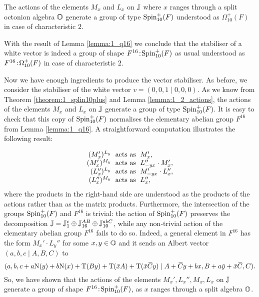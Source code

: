 \begin{theorem}
	\label{theorem:1_splin10plus}
	The actions of the elements $M_x$ and $L_x$ on $\mathbb{J}$ where $x$ ranges through a 
	split octonion algebra $\mathbb{O}$
	generate a group of type $\mathrm{Spin}_{10}^+(F)$ understood as $\Omega_{10}^+(F)$
	in case of characteristic $2$. 
\end{theorem}

With the result of Lemma \ref{lemma:1_q16} we conclude that the stabiliser of a white
vector is indeed a group of shape
$F^{16}\mathord{{\;\!{:}\;\!}}\mathrm{Spin}_{10}^+(F)$ as usual understood as $F^{16}\mathord{{\;\!{:}\;\!}}\Omega_{10}^+(F)$ in case of
characteristic $2$. 

Now we have enough ingredients to produce the vector stabiliser. As before, we consider the stabiliser of the white
    vector $v = (0,0,1\mid 0,0,0)$.
As we know from Theorem \ref{theorem:1_splin10plus} and Lemma \ref{lemma:1_2_actions}, 
the actions of the elements $M_x$ and $L_x$ on $\mathbb{J}$ generate a group of type 
$\mathrm{Spin}_{10}^+(F)$. It is easy to check
 that this copy of $\mathrm{Spin}_{10}^+(F)$ normalises the elementary abelian
group $F^{16}$ from Lemma \ref{lemma:1_q16}. A straightforward computation
illustrates the following result:

\begin{equation}
	\begin{array}{r@{\;}c@{\;}l}
		(M_x')^{L_y} & \text{ acts as } & M_x', \\
		(M_x')^{M_y} & \text{ acts as } &  L_{-yx}'' \cdot M_x', \\
		(L_x'')^{L_y} & \text{ acts as } & M_{-yx}' \cdot L_x'', \\
		(L_x'')^{M_y} & \text{ acts as } & L_x'', \\
	\end{array}
\end{equation}
where the products in the right-hand side are understood as the products of the actions rather
than as the matrix products. Furthermore, the intersection
of the groups $\mathrm{Spin}_{10}^+(F)$ and $F^{16}$ is trivial: the action of $\mathrm{Spin}_{10}^+(F)$
preserves the decomposition $\mathbb{J} = \mathbb{J}_{1}^c \oplus \mathbb{J}_{16}^{AB} \oplus \mathbb{J}_{10}^{abC}$,
while any non-trivial action of the elementary abelian group $F^{16}$ fails to do so.
Indeed, a general element in $F^{16}$ has the form $M_x' \cdot L_y''$ for some $x,y \in 
\mathbb{O}$ and it sends an Albert vector $(a,b,c\mid A,B,C)$ to 
\begin{equation*}
	(a,b,c+a\NN(y)+b\NN(x) + \Tr(By) + \Tr(\ovx A) + \Tr(\ovx \ovC y) \mid
			A+\ovC y + bx, B+a\ovy + \ovx \ovC, C ).
\end{equation*}
So, we have shown that the actions of the elements $M_x', L_x'', M_x, L_x$ on $\mathbb{J}$ generate
a group of shape $F^{16}\mathord{{\;\!{:}\;\!}}\mathrm{Spin}_{10}^+(F)$, as $x$ ranges through a split algebra $\mathbb{O}$.



